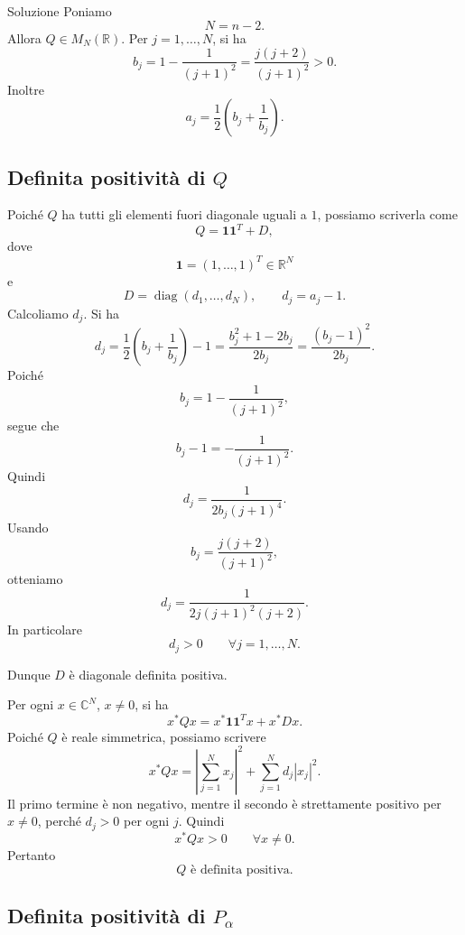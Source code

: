 \documentclass[a4paper]{article}
\begin{document}
\begin{snippetsolution}{Soluzione}
    Poniamo
    \[
        N=n-2.
    \]
    Allora \(Q\in M_N(\mathbb{R})\). Per \(j=1,\dots,N\), si ha
    \[
        b_j=1-\frac{1}{(j+1)^2}
        =
        \frac{j(j+2)}{(j+1)^2}>0.
    \]
    Inoltre
    \[
        a_j=\frac{1}{2}\left(b_j+\frac{1}{b_j}\right).
    \]

    \subsection*{Definita positività di \(Q\)}

    Poiché \(Q\) ha tutti gli elementi fuori diagonale uguali a \(1\), possiamo scriverla come
    \[
        Q=\mathbf{1}\mathbf{1}^T+D,
    \]
    dove
    \[
        \mathbf{1}=(1,\dots,1)^T\in\mathbb{R}^N
    \]
    e
    \[
        D=\operatorname{diag}(d_1,\dots,d_N),
        \qquad
        d_j=a_j-1.
    \]
    Calcoliamo \(d_j\). Si ha
    \[
        d_j
        =
        \frac{1}{2}\left(b_j+\frac{1}{b_j}\right)-1
        =
        \frac{b_j^2+1-2b_j}{2b_j}
        =
        \frac{(b_j-1)^2}{2b_j}.
    \]
    Poiché
    \[
        b_j=1-\frac{1}{(j+1)^2},
    \]
    segue che
    \[
        b_j-1=-\frac{1}{(j+1)^2}.
    \]
    Quindi
    \[
        d_j
        =
        \frac{1}{2b_j(j+1)^4}.
    \]
    Usando
    \[
        b_j=\frac{j(j+2)}{(j+1)^2},
    \]
    otteniamo
    \[
        d_j
        =
        \frac{1}{2j(j+1)^2(j+2)}.
    \]
    In particolare
    \[
        d_j>0
        \qquad
        \forall j=1,\dots,N.
    \]

    Dunque \(D\) è diagonale definita positiva.

    Per ogni \(x\in\mathbb{C}^N\), \(x\neq 0\), si ha
    \[
        x^*Qx
        =
        x^*\mathbf{1}\mathbf{1}^Tx+x^*Dx.
    \]
    Poiché \(Q\) è reale simmetrica, possiamo scrivere
    \[
        x^*Qx
        =
        \left|\sum_{j=1}^N x_j\right|^2
        +
        \sum_{j=1}^N d_j |x_j|^2.
    \]
    Il primo termine è non negativo, mentre il secondo è strettamente positivo per \(x\neq 0\), perché \(d_j>0\) per ogni \(j\). Quindi
    \[
        x^*Qx>0
        \qquad
        \forall x\neq 0.
    \]
    Pertanto
    \[
        \boxed{
            Q \text{ è definita positiva}.
        }
    \]

    \subsection*{Definita positività di \(P_\alpha\)}


\end{snippetsolution}
\end{document}
